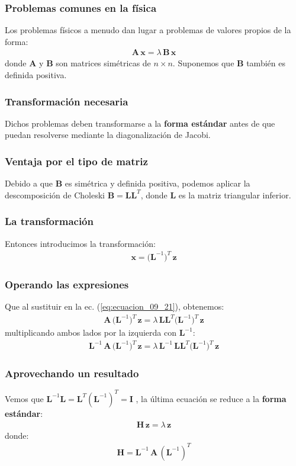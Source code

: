 \documentclass[12pt]{beamer}
\begin{document}
\begin{frame}
\frametitle{Problemas comunes en la física}
Los problemas físicos a menudo dan lugar a problemas de valores propios de la forma:
\pause
\begin{align}
\mathbf{A \, x} = \lambda \, \mathbf{B \, x}
\label{eq:ecuacion_09_21}
\end{align}
donde $\mathbf{A}$ y $\mathbf{B}$ son matrices simétricas de $n \times n$. \pause Suponemos que $\mathbf{B}$ también es definida positiva.
\end{frame}
\begin{frame}
\frametitle{Transformación necesaria}
Dichos problemas deben transformarse a la \textbf{\textcolor{cerulean}{forma estándar}} antes de que puedan resolverse mediante la diagonalización de Jacobi.
\end{frame}
\begin{frame}
\frametitle{Ventaja por el tipo de matriz}
Debido a que $\mathbf{B}$ es simétrica y definida positiva, podemos aplicar la descomposición de Choleski $\mathbf{B} = \mathbf{L L}^{T}$, \pause donde $\mathbf{L}$ es la matriz triangular inferior.
\end{frame}
\begin{frame}
\frametitle{La transformación}
Entonces introducimos la transformación:
\pause
\begin{align}
\mathbf{x} = \big( \mathbf{L}^{-1} \big)^{T} \, \mathbf{z}
\label{eq:ecuacion_09_22}
\end{align}
\end{frame}
\begin{frame}
\frametitle{Operando las expresiones}
Que al sustituir en la ec. (\ref{eq:ecuacion_09_21}), obtenemos:
\pause
\begin{align*}
\mathbf{A} \, \big( \mathbf{L}^{-1} \big)^{T} \, \mathbf{z} = \lambda \, \mathbf{L L}^{T} \big( \mathbf{L}^{-1} \big)^{T} \, \mathbf{z}
\end{align*}
\pause
multiplicando ambos lados por la izquierda con $\mathbf{L}^{-1}$:
\pause
\begin{align*}
\mathbf{L}^{-1} \, \mathbf{A} \, \big( \mathbf{L}^{-1} \big)^{T} \, \mathbf{z} = \lambda \, \mathbf{L}^{-1} \, \mathbf{L L}^{T} \big( \mathbf{L}^{-1} \big)^{T} \, \mathbf{z}
\end{align*}
\end{frame}
\begin{frame}
\frametitle{Aprovechando un resultado}
Vemos que \pause $\mathbf{L}^{-1} \mathbf{L} = \mathbf{L}^{T} (\mathbf{L}^{-1})^{T} = \mathbf{I}$ , \pause la última ecuación se reduce a la \textbf{\textcolor{darkterracotta}{forma estándar}}:
\pause
\begin{align}
\mathbf{H \, z} = \lambda \, \mathbf{z}
\label{eq:ecuacion:09_23}
\end{align}
donde:
\begin{align}
\mathbf{H} = \mathbf{L}^{-1} \, \mathbf{A} \, (\mathbf{L}^{-1})^{T}
\label{eq:ecuacion_09_24}
\end{align}
\end{frame}
\end{document}
